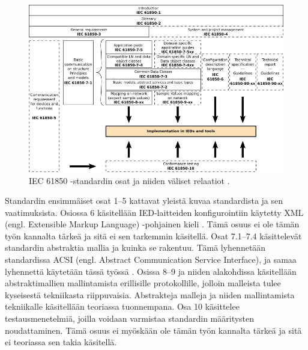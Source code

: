 \begin{figure}
	\includegraphics[width=1\textwidth]{pictures/iec61850-series-parts-and-relations.png}
	\caption{IEC 61850 -standardin osat ja niiden väliset relaatiot \cite[s.~14]{IEC61850-7-1} \cite[s.~22]{IEC61850-1}.}
	\label{fig:iec61850-osat-ja-relaatiot}
\end{figure}

Standardin ensimmäiset osat 1--5 kattavat yleistä kuvaa standardista ja sen vaatimuksista. Osiossa 6 käsitellään IED-laitteiden konfigurointiin käytetty XML (engl. Extensible Markup Language) -pohjainen kieli \cite[s.~7--8]{IEC61850-6}. Tämä osuus ei ole tämän työn kannalta tärkeä ja sitä ei sen tarkemmin käsitellä. Osat 7.1--7.4 käsittelevät standardin abstraktia mallia ja kuinka se rakentuu. Tämä lyhennetään standardissa ACSI (engl. Abstract Communication Service Interface), ja samaa lyhennettä käytetään tässä työssä \cite[s.~72]{IEC61850-7-1}. Osissa 8--9 ja niiden alakohdissa käsitellään abstraktimallien mallintamista erillisille protokollille, jolloin malleista tulee kyseisestä tekniikasta riippuvaisia. Abstrakteja malleja ja niiden mallintamista tekniikalle käsitellään teoriassa tuonnempana. Osa 10 käsittelee testausmenetelmiä, joilla voidaan varmistaa standardin määritysten noudattaminen. Tämä osuus ei myöskään ole tämän työn kannalta tärkeä ja sitä ei teoriassa sen takia käsitellä. \cite[s.~15]{IEC61850-7-1}


